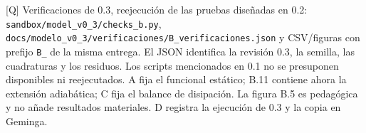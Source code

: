 \documentclass[
  spanish,
  10pt,
  a4paper,
]{article}
\begin{document}
{[}Q{]} Verificaciones de 0.3, reejecución de las pruebas diseñadas en
0.2: \nolinkurl{sandbox/model_v0_3/checks_b.py},
\nolinkurl{docs/modelo_v0_3/verificaciones/B_verificaciones.json} y
CSV/figuras con prefijo \nolinkurl{B_} de la misma entrega. El JSON
identifica la revisión 0.3, la semilla, las cuadraturas y los residuos.
Los scripts mencionados en 0.1 no se presuponen disponibles ni
reejecutados. A fija el funcional estático; B.11 contiene ahora la
extensión adiabática; C fija el balance de disipación. La figura B.5 es
pedagógica y no añade resultados materiales. D registra la ejecución de
0.3 y la copia en Geminga.
\end{document}
